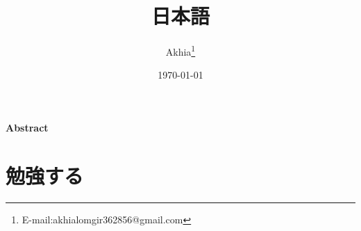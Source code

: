 \documentclass[UTF8,a4paper,12pt,onecolumn,twoside]{article}
\title{日本語}
\author{Akhia\thanks{E-mail:akhialomgir362856@gmail.com}}
\date{\today}
\begin{document}
\maketitle
\begin{center}
    \large\textbf{Abstract}
\end{center}
\newpage
\tableofcontents
\newpage
\section{勉強する}
\end{document}
